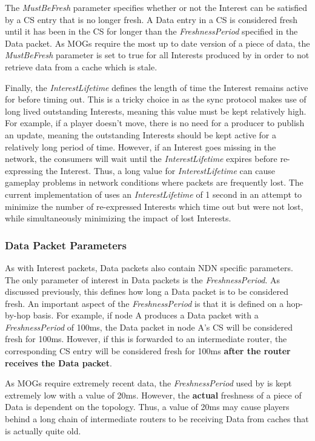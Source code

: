 The \textit{MustBeFresh} parameter specifies whether or not the Interest can be satisfied by a CS entry that is no longer fresh. A Data entry in a CS is considered fresh until it has been in the CS for longer than the \textit{FreshnessPeriod} specified in the Data packet. As MOGs require the most up to date version of a piece of data, the \textit{MustBeFresh} parameter is set to true for all Interests produced by \game{} in order to not retrieve data from a cache which is stale.

Finally, the \textit{InterestLifetime} defines the length of time the Interest remains active for before timing out. This is a tricky choice in \game{} as the sync protocol makes use of long lived outstanding Interests, meaning this value must be kept relatively high. For example, if a player doesn't move, there is no need for a producer to publish an update, meaning the outstanding Interests should be kept active for a relatively long period of time. However, if an Interest goes missing in the network, the consumers will wait until the \textit {InterestLifetime} expires before re-expressing the Interest. Thus, a long value for \textit{InterestLifetime} can cause gameplay problems in network conditions where packets are frequently lost. The current implementation of \game{} uses an \textit{InterestLifetime} of 1 second in an attempt to minimize the number of re-expressed Interests which time out but were not lost, while simultaneously minimizing the impact of lost Interests.

\subsubsection{Data Packet Parameters}
As with Interest packets, Data packets also contain NDN specific parameters. The only parameter of interest in Data packets is the \textit{FreshnessPeriod}. As discussed previously, this defines how long a Data packet is to be considered fresh. An important aspect of the \textit{FreshnessPeriod} is that it is defined on a hop-by-hop basis. For example, if node A produces a Data packet with a \textit{FreshnessPeriod} of 100ms, the Data packet in node A's CS will be considered fresh for 100ms. However, if this is forwarded to an intermediate router, the corresponding CS entry will be considered fresh for 100ms \textbf{after the router receives the Data packet}. 

As MOGs require extremely recent data, the \textit{FreshnessPeriod} used by \game{} is kept extremely low with a value of 20ms. However, the \textbf{actual} freshness of a piece of Data is dependent on the topology. Thus, a value of 20ms may cause players behind a long chain of intermediate routers to be receiving Data from caches that is actually quite old.

